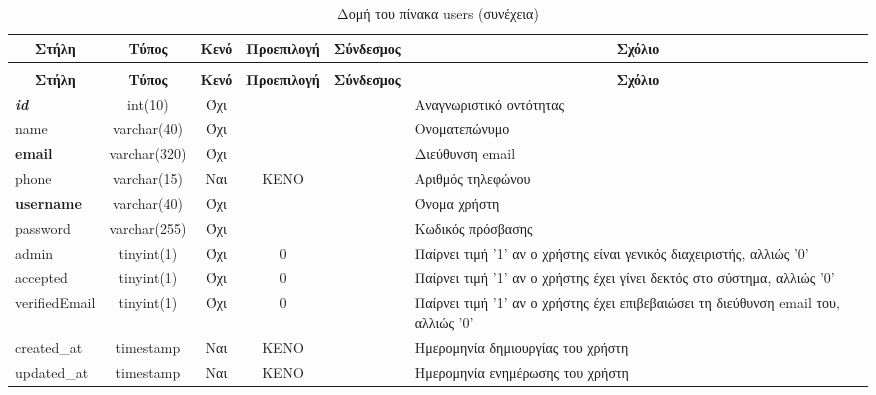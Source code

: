 %
%
\begin{longtable}{|l|c|c|c|l|p{4.5cm}|}
	\caption{Δομή του πίνακα users} \label{tab:users-structure} \\
	\hline \multicolumn{1}{|c|}{\textbf{Στήλη}} & \multicolumn{1}{|c|}{\textbf{Τύπος}} & \multicolumn{1}{|c|}{\textbf{Κενό}} & \multicolumn{1}{|c|}{\textbf{Προεπιλογή}} & \multicolumn{1}{|c|}{\textbf{Σύνδεσμος}} & \multicolumn{1}{|c|}{\textbf{Σχόλιο}} \\ \hline \hline
	\endfirsthead
	\caption{Δομή του πίνακα users (συνέχεια)} \\ 
	\hline \multicolumn{1}{|c|}{\textbf{Στήλη}} & \multicolumn{1}{|c|}{\textbf{Τύπος}} & \multicolumn{1}{|c|}{\textbf{Κενό}} & \multicolumn{1}{|c|}{\textbf{Προεπιλογή}} & \multicolumn{1}{|c|}{\textbf{Σύνδεσμος}} & \multicolumn{1}{|c|}{\textbf{Σχόλιο}} \\ \hline \hline \endhead \endfoot 
	\textbf{\textit{id}} & int(10) & Όχι &  &  & Αναγνωριστικό οντότητας \\ \hline 
	name & varchar(40) & Όχι &  &  & Ονοματεπώνυμο \\ \hline 
	\textbf{email} & varchar(320) & Όχι &  &  & Διεύθυνση email\\ \hline 
	phone & varchar(15) & Ναι & ΚΕΝΟ &  & Αριθμός τηλεφώνου \\ \hline 
	\textbf{username} & varchar(40) & Όχι &  &  & Όνομα χρήστη \\ \hline 
	password & varchar(255) & Όχι &  &  & Κωδικός πρόσβασης \\ \hline 
	admin & tinyint(1) & Όχι & 0 &  & Παίρνει τιμή '1' αν ο χρήστης είναι γενικός διαχειριστής, αλλιώς '0' \\ \hline 
	accepted & tinyint(1) & Όχι & 0 &  & Παίρνει τιμή '1' αν ο χρήστης έχει γίνει δεκτός στο σύστημα, αλλιώς '0' \\ \hline 
	verifiedEmail & tinyint(1) & Όχι & 0 &  & Παίρνει τιμή '1' αν ο χρήστης έχει επιβεβαιώσει τη διεύθυνση email του, αλλιώς '0' \\ \hline 
	created\_at & timestamp & Ναι & ΚΕΝΟ &  & Ημερομηνία δημιουργίας του χρήστη \\ \hline 
	updated\_at & timestamp & Ναι & ΚΕΝΟ &  & Ημερομηνία ενημέρωσης του χρήστη \\ \hline 
\end{longtable}

